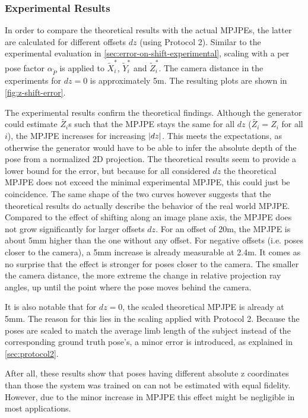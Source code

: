 \subsubsection{Experimental Results}
\label{sec:error-on-shift-experimental}



In order to compare the theoretical results with the actual MPJPEs, the latter are calculated for different offsets $dz$ (using Protocol 2).
Similar to the experimental evaluation in \autoref{sec:error-on-shift-experimental}, scaling with a per pose factor $\alpha_{\widetilde{P}}$ is applied to $\widetilde{X}_i^\ast$, $\widetilde{Y}_i^\ast$ and $\widetilde{Z}_i^\ast$.
The camera distance in the experiments for $dz = 0$ is approximately 5m.
The resulting plots are shown in \autoref{fig:z-shift-error}.

The experimental results confirm the theoretical findings.
Although the generator could estimate $\widetilde{Z_i}$s such that the MPJPE stays the same for all $dz$ ($\widetilde{Z_i} = Z_i$ for all $i$), the MPJPE increases for increasing $\abs{dz}$.
This meets the expectations, as otherwise the generator would have to be able to infer the absolute depth of the pose from a normalized 2D projection.
The theoretical results seem to provide a lower bound for the error, but because for all considered $dz$ the theoretical MPJPE does not exceed the minimal experimental MPJPE, this could just be coincidence.
The same shape of the two curves however suggests that the theoretical results do actually describe the behavior of the real world MPJPE.
Compared to the effect of shifting along an image plane axis, the MPJPE does not grow significantly for larger offsets $dz$.
For an offset of 20m, the MPJPE is about 5mm higher than the one without any offset.
For negative offsets (i.e. poses closer to the camera), a 5mm increase is already measurable at 2.4m.
It comes as no surprise that the effect is stronger for poses closer to the camera.
The smaller the camera distance, the more extreme the change in relative projection ray angles, up until the point where the pose moves behind the camera.

It is also notable that for $dz = 0$, the scaled theoretical MPJPE is already at 5mm.
The reason for this lies in the scaling applied with Protocol 2.
Because the poses are scaled to match the average limb length of the subject instead of the corresponding ground truth pose's, a minor error is introduced, as explained in \autoref{sec:protocol2}.

After all, these results show that poses having different absolute z coordinates than those the system was trained on can not be estimated with equal fidelity.
However, due to the minor increase in MPJPE this effect might be negligible in most applications.